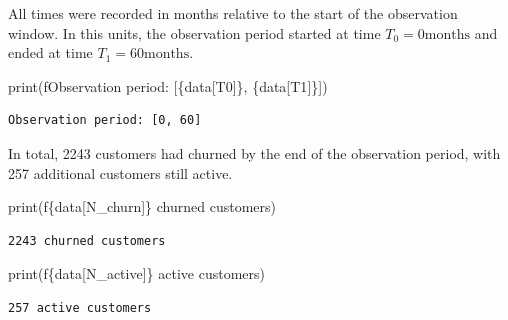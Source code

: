 \documentclass[
  letterpaper,
  DIV=11,
  numbers=noendperiod]{scrartcl}
\newenvironment{Shaded}{\begin{snugshade}}{\end{snugshade}}
\newcommand{\BuiltInTok}[1]{\textcolor[rgb]{0.00,0.23,0.31}{#1}}
\newcommand{\NormalTok}[1]{\textcolor[rgb]{0.00,0.23,0.31}{#1}}
\newcommand{\SpecialCharTok}[1]{\textcolor[rgb]{0.37,0.37,0.37}{#1}}
\newcommand{\SpecialStringTok}[1]{\textcolor[rgb]{0.13,0.47,0.30}{#1}}
\newcommand{\StringTok}[1]{\textcolor[rgb]{0.13,0.47,0.30}{#1}}
\begin{document}
All times were recorded in months relative to the start of the
observation window. In this units, the observation period started at
time \(T_{0} = 0 \text{months}\) and ended at time
\(T_{1} = 60 \text{months}\).

\begin{Shaded}
\begin{Highlighting}[]
\BuiltInTok{print}\NormalTok{(}\SpecialStringTok{f\textquotesingle{}Observation period: [}\SpecialCharTok{\{}\NormalTok{data[}\StringTok{\textquotesingle{}T0\textquotesingle{}}\NormalTok{]}\SpecialCharTok{\}}\SpecialStringTok{, }\SpecialCharTok{\{}\NormalTok{data[}\StringTok{\textquotesingle{}T1\textquotesingle{}}\NormalTok{]}\SpecialCharTok{\}}\SpecialStringTok{]\textquotesingle{}}\NormalTok{)}
\end{Highlighting}
\end{Shaded}

\begin{verbatim}
Observation period: [0, 60]
\end{verbatim}

In total, 2243 customers had churned by the end of the observation
period, with 257 additional customers still active.

\begin{Shaded}
\begin{Highlighting}[]
\BuiltInTok{print}\NormalTok{(}\SpecialStringTok{f\textquotesingle{}}\SpecialCharTok{\{}\NormalTok{data[}\StringTok{\textquotesingle{}N\_churn\textquotesingle{}}\NormalTok{]}\SpecialCharTok{\}}\SpecialStringTok{ churned customers\textquotesingle{}}\NormalTok{)}
\end{Highlighting}
\end{Shaded}

\begin{verbatim}
2243 churned customers
\end{verbatim}

\begin{Shaded}
\begin{Highlighting}[]
\BuiltInTok{print}\NormalTok{(}\SpecialStringTok{f\textquotesingle{}}\SpecialCharTok{\{}\NormalTok{data[}\StringTok{\textquotesingle{}N\_active\textquotesingle{}}\NormalTok{]}\SpecialCharTok{\}}\SpecialStringTok{ active customers\textquotesingle{}}\NormalTok{)}
\end{Highlighting}
\end{Shaded}

\begin{verbatim}
257 active customers
\end{verbatim}
\end{document}
